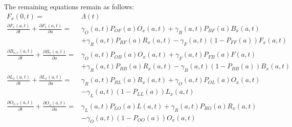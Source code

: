 \documentclass{article}
\begin{document}
The remaining equations remain as follows: 
%
\begin{equation}\begin{array}{rl}
F_{x}(0,t) =& \Lambda(t) \\
%
\frac{\partial F_{x}(a,t)}{\partial t} + \frac{\partial
F_{x}(a,t)}{\partial a} =&
\gamma_O(a,t) P_{OF}(a) O_x(a,t)
+ \gamma_B(a,t) P_{BF}(a) B_x(a,t)\\ &
 + \gamma_R(a,t) P_{RF}(a) R_x(a,t)
- \gamma_F(a,t) (1-P_{FF}(a)) F_{x}(a,t)\\
%
%
\frac{\partial B_{o,x}(a,t)}{\partial t} + \frac{\partial
B_{x}(a,t)}{\partial a} =&  \gamma_O(a,t) P_{OB}(a) O_x(a,t) +
\gamma_F(a,t) P_{FB}(a) F(a,t)\\ &
+ \gamma_R(a,t) P_{RB}(a) R_x(a,t) 
- \gamma_B(a,t) (1 - P_{BB}(a)) B_{x}(a,t)\\
%

\frac{\partial L_{x} (a,t)}{\partial t} + \frac{\partial
L_{x} (a,t)}{\partial a} =& \gamma_R(a,t) P_{RL}(a) R_x(a,t) +
\gamma_O(a,t) P_{OL}(a) O_x(a,t) \\&
- \gamma_L(a,t) (1 - P_{LL}(a)) L_{x}(a,t)
\\
%
\frac{\partial O_{o,x}(a,t)}{\partial t} + \frac{\partial
O_{x}(a,t)}{\partial a} =& \gamma_L(a,t) P_{LO}(a) L(a,t)
+ \gamma_R(a,t) P_{RO}(a) R_x(a,t)
\\&
- \gamma_O(a,t) (1 - P_{OO}(a)) O_{x}(a,t)
\\
%
\end{array}\end{equation}
%
\end{document}
